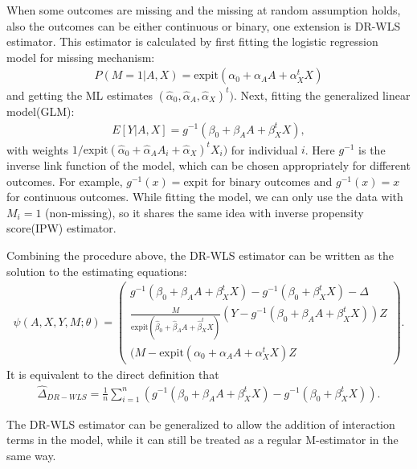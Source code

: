 \documentclass{article}
\begin{document}
When some outcomes are missing and the missing at random assumption holds, also the outcomes can be either continuous or binary, one extension is DR-WLS estimator.
This estimator is calculated by first fitting the logistic regression model for missing mechanism:
\begin{align}\label{missing model}
    P(M=1|A,X)=\mathrm{expit}(\alpha_0+\alpha_A A+\alpha_{X}^{t}X)
\end{align}
and getting the ML estimates $(\hat{\alpha}_0,\hat{\alpha}_A,\hat{\alpha}_{X})^{t})$. Next, fitting the generalized linear model(GLM):
\begin{align}\label{outcome model}
    E[Y|A,X]=g^{-1}(\beta_0+\beta_A A+\beta_{X}^{t}X),
\end{align}
with weights $1/\mathrm{expit}(\hat{\alpha}_0+\hat{\alpha}_A A_i+\hat{\alpha}_{X})^{t}X_i)$ for individual $i$.
Here $g^{-1}$ is the inverse link function of the model, which can be chosen appropriately for different outcomes.
For example, $g^{-1}(x)=\mathrm{expit}$ for binary outcomes and $g^{-1}(x)=x$ for continuous outcomes.
While fitting the model, we can only use the data with $M_i=1$ (non-missing), so it shares the same idea with inverse propensity score(IPW) estimator\cite{robins1994estimation}.

Combining the procedure above, the DR-WLS estimator can be written as the solution to the estimating equations:
\begin{align}
    \psi(A,X,Y,M;\theta) = \left(
    \begin{array}{c}
    g^{-1}(\beta_0+\beta_A A+\beta_{X}^{t}X)-g^{-1}(\beta_0+\beta_{X}^{t}X)-\Delta        \\
    \frac{M}{\mathrm{expit}(\hat{\beta}_0+\hat{\beta}_A A+\hat{\beta}_{X}^{t}X)}(Y-g^{-1}(\beta_0+\beta_A A+\beta_{X}^{t}X))Z   \\
    (M-\mathrm{expit}(\alpha_0+\alpha_A A+\alpha_{X}^{t}X)Z
    \end{array}
    \right).\nonumber
\end{align}
It is equivalent to the direct definition that
\begin{align}
    \hat{\Delta}_{DR-WLS}=\frac{1}{n}\sum_{i=1}^n (g^{-1}(\beta_0+\beta_A A+\beta_{X}^{t}X)-g^{-1}(\beta_0+\beta_{X}^{t}X)).\nonumber
\end{align}

The DR-WLS estimator can be generalized to allow the addition
of interaction terms in the model, while it can still be treated as a regular M-estimator in the same way.
\end{document}
